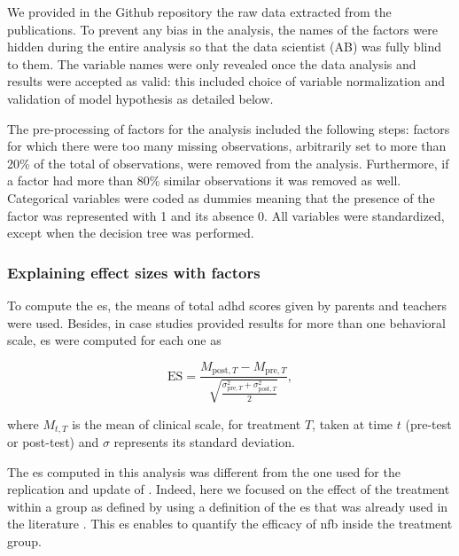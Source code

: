 We provided in the Github repository \citep{Bussalb2018} the raw data extracted from the publications. To prevent any
bias in the analysis, the names of the factors
were hidden during the entire analysis so that the data scientist (AB) was fully blind to them. The variable names were only revealed once the data 
analysis and results were accepted as valid: this included choice of variable normalization and validation of model hypothesis as detailed below.

The pre-processing of factors for the analysis included the following steps: factors for which there were too many missing observations, 
arbitrarily set to more than 20\% of the total of observations, were removed from the analysis. Furthermore, if a factor had more than 
80\% similar observations it was removed as well. Categorical variables were coded as dummies meaning that the presence
of the factor was represented with 1
and its absence 0. All variables were standardized, except when the decision tree was performed. 

\subsubsection{Explaining effect sizes with factors}

To compute the \gls{es}, the  means of total \gls{adhd} scores given by parents and teachers were used. Besides, in case studies provided results 
for more than one behavioral scale, \gls{es} were computed for each one as 

\begin{equation*}
\label{eq:factors_effect_size_within_subject}
\text{ES} = \frac{M_{\text{post},T} - M_{\text{pre},T}}{\sqrt{\frac{\sigma_{\text{pre},T}^2 + \sigma_{\text{post},T}^2}{2}}},
\end{equation*} 

where $M_{t,T}$ is the mean of clinical scale, for treatment $T$, taken at time $t$ (pre-test or post-test) and $\sigma$ represents its standard deviation.

The \gls{es} computed in this analysis was different from the one 
used for the replication and update of \citet{Cortese2016}. Indeed, here we focused on the effect of the treatment within 
a group as defined by \citet{Cohen1988} using a definition of the \gls{es} that was already used in the literature \citep{Arns2009, Maurizio2014, 
  Strehl2017}. This \gls{es} enables to quantify the efficacy of \gls{nfb} inside the treatment group. 

